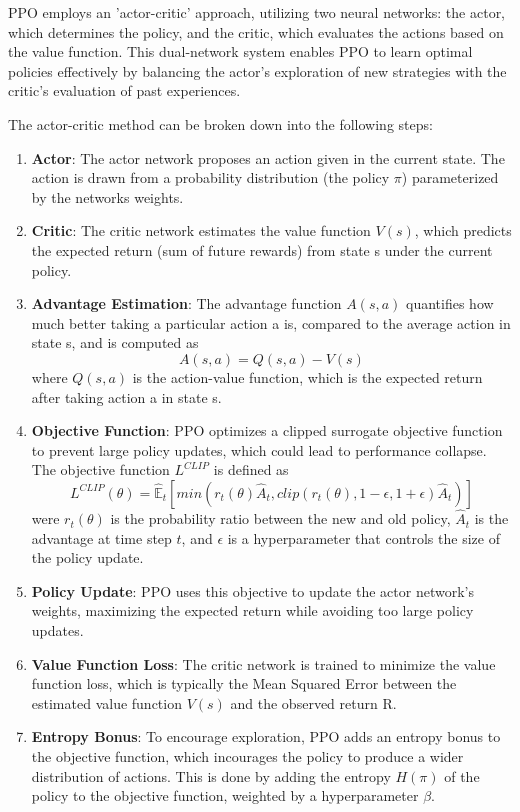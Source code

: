 PPO employs an 'actor-critic' approach, utilizing two neural networks: the actor, which determines the policy, and the critic, which evaluates the actions based on the value function. This dual-network system enables PPO to learn optimal policies effectively by balancing the actor's exploration of new strategies with the critic's evaluation of past experiences.

The actor-critic method can be broken down into the following steps:
\begin{enumerate}
    \item \textbf{Actor}: The actor network proposes an action given in the current state. The action is drawn from a probability distribution (the policy $\pi$) parameterized by the networks weights.
    \item \textbf{Critic}: The critic network estimates the value function $V(s)$, which predicts the expected return (sum of future rewards) from state s under the current policy.
    \item \textbf{Advantage Estimation}: The advantage function $A(s,a)$ quantifies how much better taking a particular action a is, compared to the average action in state s, and is computed as 
    \begin{equation}
        A(s,a) = Q(s,a) - V(s)
    \end{equation}
    where $Q(s,a)$ is the action-value function, which is the expected return after taking action a in state s.
    \item \textbf{Objective Function}:  PPO optimizes a clipped surrogate objective function to prevent large policy updates, which could lead to performance collapse. The objective function $L^{CLIP}$ is defined as
    \begin{equation}
        L^{CLIP}(\theta) = \hat{\mathbb{E}}_t[min(r_t(\theta)\hat{A}_t, clip(r_t(\theta), 1-\epsilon, 1+\epsilon)\hat{A}_t)]
    \end{equation}
    were $r_t(\theta)$ is the probability ratio between the new and old policy, $\hat{A}_t$ is the advantage at time step $t$, and $\epsilon$ is a hyperparameter that controls the size of the policy update.
    \item \textbf{Policy Update}: PPO uses this objective to update the actor network's weights, maximizing the expected return while avoiding too large policy updates.
    \item \textbf{Value Function Loss}: The critic network is trained to minimize the value function loss, which is typically the Mean Squared Error between the estimated value function $V(s)$ and the observed return R.
    \item \textbf{Entropy Bonus}: To encourage exploration, PPO adds an entropy bonus to the objective function, which incourages the policy to produce a wider distribution of actions. This is done by adding the entropy $H(\pi)$ of the policy to the objective function, weighted by a hyperparameter $\beta$.
\end{enumerate}

